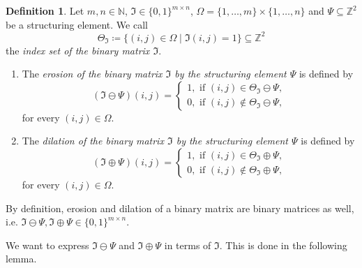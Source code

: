 \documentclass[a4paper,12pt]{article}
\theoremstyle{plain}
\theoremstyle{definition}
\newtheorem{definition}[theorem]{Definition}
\begin{document}
\begin{definition}
	Let $m, n \in \mathbb{N}$, $\mathfrak{I} \in \{ 0, 1 \}^{m \times n}$, $\Omega = \{ 1, \dots, m \} \times \{ 1, \dots, n \}$ and $\Psi \subseteq \mathbb{Z}^2$ be a structuring element. We call
	\begin{equation*}
		\Theta_\mathfrak{I} \coloneqq \{ (i, j) \in \Omega \mid \mathfrak{I}(i, j) = 1 \} \subseteq \mathbb{Z}^2
	\end{equation*}
	the \emph{index set of the binary matrix $\mathfrak{I}$}.
	\begin{enumerate}
		\item The \emph{erosion of the binary matrix $\mathfrak{I}$ by the structuring element $\Psi$} is defined by
		\begin{equation}
			(\mathfrak{I} \ominus \Psi)(i, j) =
			\begin{cases}
				1, \textrm{ if } (i, j) \in \Theta_\mathfrak{I} \ominus \Psi, \\
				0, \textrm{ if } (i, j) \notin \Theta_\mathfrak{I} \ominus \Psi,
			\end{cases}
		\end{equation}
		for every $(i, j) \in \Omega$.
		\item The \emph{dilation of the binary matrix $\mathfrak{I}$ by the structuring element $\Psi$} is defined by
		\begin{equation}
			(\mathfrak{I} \oplus \Psi)(i, j) =
			\begin{cases}
				1, \textrm{ if } (i, j) \in \Theta_\mathfrak{I} \oplus \Psi, \\
				0, \textrm{ if } (i, j) \notin \Theta_\mathfrak{I} \oplus \Psi,
			\end{cases}
		\end{equation}
		for every $(i, j) \in \Omega$.
	\end{enumerate}
\end{definition}

By definition, erosion and dilation of a binary matrix are binary matrices as well, i.e. $\mathfrak{I} \ominus \Psi, \mathfrak{I} \oplus \Psi \in \{ 0, 1 \}^{m \times n}$.

We want to express $\mathfrak{I} \ominus \Psi$ and $\mathfrak{I} \oplus \Psi$ in terms of $\mathfrak{I}$. This is done in the following lemma.
\end{document}
